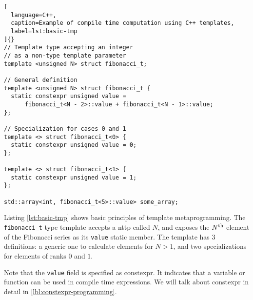 \documentclass[../main]{subfiles}
\begin{document}
\begin{lstlisting}[
  language=C++,
  caption=Example of compile time computation using C++ templates,
  label=lst:basic-tmp
]{}
// Template type accepting an integer
// as a non-type template parameter
template <unsigned N> struct fibonacci_t;

// General definition
template <unsigned N> struct fibonacci_t {
  static constexpr unsigned value =
      fibonacci_t<N - 2>::value + fibonacci_t<N - 1>::value;
};

// Specialization for cases 0 and 1
template <> struct fibonacci_t<0> {
  static constexpr unsigned value = 0;
};

template <> struct fibonacci_t<1> {
  static constexpr unsigned value = 1;
};

std::array<int, fibonacci_t<5>::value> some_array;
\end{lstlisting}

Listing \ref{lst:basic-tmp} shows basic principles of \cpp template
metaprogramming. The \lstinline{fibonacci_t} type template accepts a
\gls{nttp} called $N$, and exposes the
$N\textsuperscript{th}$ element of the Fibonacci series as its
\lstinline{value} static member. The template has 3 definitions:
a generic one to calculate elements for $N > 1$,
and two specializations for elements of ranks $0$ and $1$.

Note that the \lstinline{value} field is specified as \gls{constexpr}.
It indicates that a variable or function can be used in compile time
expressions.
We will talk about \gls{constexpr} in detail in \ref{lbl:constexpr-programming}.
\end{document}
